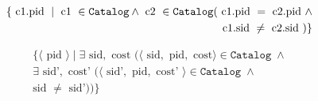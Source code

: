 \begin{align*}
  \{ \text{ c1.pid } \mid \text{ c1 } \in \mathtt{Catalog} \wedge \text{ c2 } \in \mathtt{Catalog} ( \text{ c1.pid } = \text{ c2.pid } \wedge \\ 
  \text{ c1.sid } \neq \text{ c2.sid }) \}
\end{align*}

\begin{align*}
  \{\langle \text{ pid } \rangle 
    \mid \exists \text{ sid}, \text{ cost } 
    (\langle \text{ sid}, \text{ pid}, \text{ cost} \rangle 
      \in \mathtt{Catalog} \; \wedge \\ \exists \text{ sid'}, \text{ cost' } (
        \langle \text{ sid'}, \text{ pid}, \text{ cost' } \rangle 
    \in \mathtt{Catalog} \; \wedge \\
  \text{sid } \neq \text{ sid'}))\}
\end{align*}

